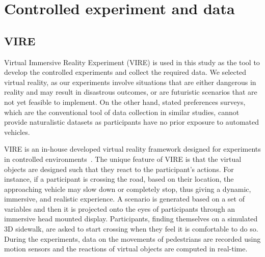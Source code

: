\section{Controlled experiment and data}
\label{S:data}
\subsection{VIRE}
Virtual Immersive Reality Experiment (VIRE) is used in this study as the tool to develop the controlled experiments and collect the required data. We selected virtual reality, as our experiments involve situations that are either dangerous in reality and may result in disastrous outcomes, or are futuristic scenarios that are not yet feasible to implement. On the other hand, stated preferences surveys, which are the conventional tool of data collection in similar studies, cannot provide naturalistic datasets as participants have no prior exposure to automated vehicles.

 VIRE is an in-house developed virtual reality framework designed for experiments in controlled environments~\citep{farooq2018virtual}. The unique feature of VIRE is that the virtual objects are designed such that they react to the participant's actions. For instance, if a participant is crossing the road, based on their location, the approaching vehicle may slow down or completely stop, thus giving a dynamic, immersive, and realistic experience. A scenario is generated based on a set of variables and then it is projected onto the eyes of participants through an immersive head mounted display. Participants, finding themselves on a simulated 3D sidewalk, are asked to start crossing when they feel it is comfortable to do so. During the experiments, data on the movements of pedestrians are recorded using motion sensors and the reactions of virtual objects are computed in real-time.

